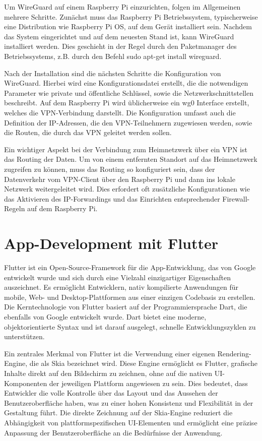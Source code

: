 \documentclass[oneside]{ausarbeitung}
\begin{document}
Um WireGuard auf einem Raspberry Pi einzurichten, folgen im Allgemeinen mehrere Schritte. Zunächst muss das Raspberry Pi Betriebssystem, typischerweise eine Distribution wie Raspberry Pi OS, auf dem Gerät installiert sein. Nachdem das System eingerichtet und auf dem neuesten Stand ist, kann WireGuard installiert werden. Dies geschieht in der Regel durch den Paketmanager des Betriebssystems, z.B. durch den Befehl sudo apt-get install wireguard.

Nach der Installation sind die nächsten Schritte die Konfiguration von WireGuard. Hierbei wird eine Konfigurationsdatei erstellt, die die notwendigen Parameter wie private und öffentliche Schlüssel, sowie die Netzwerkschnittstellen beschreibt. Auf dem Raspberry Pi wird üblicherweise ein wg0 Interface erstellt, welches die VPN-Verbindung darstellt. Die Konfiguration umfasst auch die Definition der IP-Adressen, die den VPN-Teilnehmern zugewiesen werden, sowie die Routen, die durch das VPN geleitet werden sollen.

Ein wichtiger Aspekt bei der Verbindung zum Heimnetzwerk über ein VPN ist das Routing der Daten. Um von einem entfernten Standort auf das Heimnetzwerk zugreifen zu können, muss das Routing so konfiguriert sein, dass der Datenverkehr vom VPN-Client über den Raspberry Pi und dann ins lokale Netzwerk weitergeleitet wird. Dies erfordert oft zusätzliche Konfigurationen wie das Aktivieren des IP-Forwardings und das Einrichten entsprechender Firewall-Regeln auf dem Raspberry Pi.

\section{App-Development mit Flutter}
\label{sec:foundations_flutter}

Flutter ist ein Open-Source-Framework für die App-Entwicklung, das von Google entwickelt wurde und sich durch eine Vielzahl einzigartiger Eigenschaften auszeichnet. Es ermöglicht Entwicklern, nativ kompilierte Anwendungen für mobile, Web- und Desktop-Plattformen aus einer einzigen Codebasis zu erstellen. Die Kerntechnologie von Flutter basiert auf der Programmiersprache Dart, die ebenfalls von Google entwickelt wurde. Dart bietet eine moderne, objektorientierte Syntax und ist darauf ausgelegt, schnelle Entwicklungszyklen zu unterstützen.

Ein zentrales Merkmal von Flutter ist die Verwendung einer eigenen Rendering-Engine, die als Skia bezeichnet wird. Diese Engine ermöglicht es Flutter, grafische Inhalte direkt auf den Bildschirm zu zeichnen, ohne auf die nativen UI-Komponenten der jeweiligen Plattform angewiesen zu sein. Dies bedeutet, dass Entwickler die volle Kontrolle über das Layout und das Aussehen der Benutzeroberfläche haben, was zu einer hohen Konsistenz und Flexibilität in der Gestaltung führt. Die direkte Zeichnung auf der Skia-Engine reduziert die Abhängigkeit von plattformspezifischen UI-Elementen und ermöglicht eine präzise Anpassung der Benutzeroberfläche an die Bedürfnisse der Anwendung.
\end{document}
